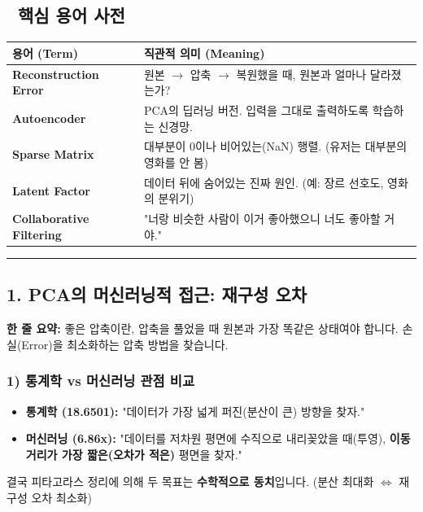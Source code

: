 \documentclass[11pt,a4paper]{book}
\theoremstyle{definition}
\begin{document}
\subsection*{📝 핵심 용어 사전}
\begin{table}[h]
\centering
\begin{tabularx}{\textwidth}{|p{}|X|}
\hline
\textbf{용어 (Term)} & \textbf{직관적 의미 (Meaning)} \\
\hline
\textbf{Reconstruction Error} & 원본 $\to$ 압축 $\to$ 복원했을 때, 원본과 얼마나 달라졌는가? \\
\hline
\textbf{Autoencoder} & PCA의 딥러닝 버전. 입력을 그대로 출력하도록 학습하는 신경망. \\
\hline
\textbf{Sparse Matrix} & 대부분이 0이나 비어있는(NaN) 행렬. (유저는 대부분의 영화를 안 봄) \\
\hline
\textbf{Latent Factor} & 데이터 뒤에 숨어있는 진짜 원인. (예: 장르 선호도, 영화의 분위기) \\
\hline
\textbf{Collaborative Filtering} & "너랑 비슷한 사람이 이거 좋아했으니 너도 좋아할 거야." \\
\hline
\end{tabularx}
\end{table}

\vspace{0.5cm}\hrule\vspace{0.5cm}

\subsection{1. PCA의 머신러닝적 접근: 재구성 오차}


\begin{conceptbox}[title={개념 1: 파일 압축과 해제}]
\textbf{한 줄 요약:} 좋은 압축이란, 압축을 풀었을 때 원본과 가장 똑같은 상태여야 합니다. 손실(Error)을 최소화하는 압축 방법을 찾습니다.
\end{conceptbox}

\subsubsection*{1) 통계학 vs 머신러닝 관점 비교}
\begin{itemize}
    \item \textbf{통계학 (18.6501):} "데이터가 가장 넓게 퍼진(분산이 큰) 방향을 찾자."
    \item \textbf{머신러닝 (6.86x):} "데이터를 저차원 평면에 수직으로 내리꽂았을 때(투영), \textbf{이동 거리가 가장 짧은(오차가 적은)} 평면을 찾자."
\end{itemize}
결국 피타고라스 정리에 의해 두 목표는 \textbf{수학적으로 동치}입니다. (분산 최대화 $\iff$ 재구성 오차 최소화)
\end{document}

